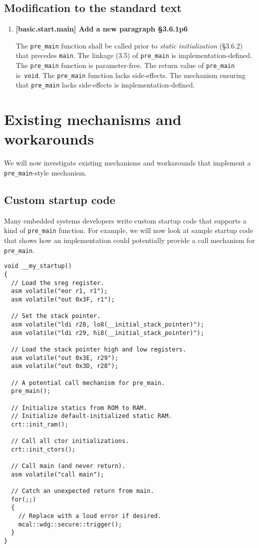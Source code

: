\documentclass[11pt]{article}
\begin{document}
\subsection*{Modification to the standard text}
\begin{enumerate}

  \item \textbf{[basic.start.main] Add a new paragraph \S3.6.1p6}

  The \lstinline{pre_main} function shall be called prior to
  \emph{static} \emph{initialization} (\S3.6.2)
  that precedes \lstinline{main}.
  The linkage (3.5) of \lstinline{pre_main} is implementation-defined.
  The \lstinline{pre_main} function is parameter-free.
  The return value of \lstinline{pre_main} is~\lstinline{void}.
  The \lstinline{pre_main} function lacks side-effects.
  The mechanism ensuring that \lstinline{pre_main} lacks
  side-effects is implementation-defined.

\end{enumerate}

\section{Existing mechanisms and workarounds}

We will now investigate existing mechanisms and
workarounds that implement a \lstinline{pre_main}-style
mechanism.

\subsection*{Custom startup code}

Many embedded systems developers write custom startup
code that supports a kind of \lstinline{pre_main} function.
For example, we will now look at sample startup code that
shows how an implementation could potentially provide
a call mechanism for \lstinline{pre_main}.
  
\begin{lstlisting}
void __my_startup()
{
  // Load the sreg register.
  asm volatile("eor r1, r1");
  asm volatile("out 0x3F, r1");

  // Set the stack pointer.
  asm volatile("ldi r28, lo8(__initial_stack_pointer)");
  asm volatile("ldi r29, hi8(__initial_stack_pointer)");

  // Load the stack pointer high and low registers.
  asm volatile("out 0x3E, r29");
  asm volatile("out 0x3D, r28");

  // A potential call mechanism for pre_main.
  pre_main();

  // Initialize statics from ROM to RAM.
  // Initialize default-initialized static RAM.
  crt::init_ram();

  // Call all ctor initializations.
  crt::init_ctors();

  // Call main (and never return).
  asm volatile("call main");

  // Catch an unexpected return from main.
  for(;;)
  {
    // Replace with a loud error if desired.
    mcal::wdg::secure::trigger();
  }
}
\end{lstlisting}
  
\end{document}
